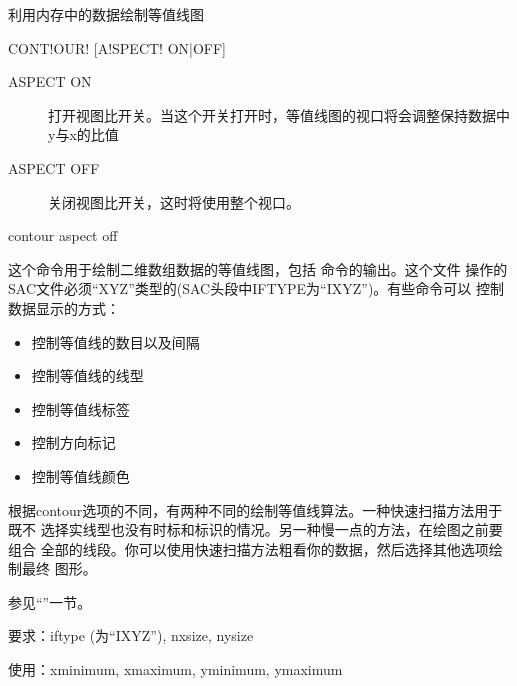 \label{cmd:contour}

利用内存中的数据绘制等值线图

\begin{SACSTX}
CONT!OUR! [A!SPECT! ON|OFF]
\end{SACSTX}

\begin{description}
\item [ASPECT ON] 打开视图比开关。当这个开关打开时，等值线图的视口将会调整保持数据中y与x的比值
\item [ASPECT OFF] 关闭视图比开关，这时将使用整个视口。
\end{description}

\begin{SACDFT}
contour  aspect  off
\end{SACDFT}

这个命令用于绘制二维数组数据的等值线图，包括 
命令的输出。这个文件
操作的SAC文件必须``XYZ''类型的(SAC头段中IFTYPE为``IXYZ'')。有些命令可以
控制数据显示的方式：
\begin{itemize}
\item {} 控制等值线的数目以及间隔
\item {} 控制等值线的线型
\item {} 控制等值线标签
\item {} 控制方向标记
\item {} 控制等值线颜色
\end{itemize}

根据contour选项的不同，有两种不同的绘制等值线算法。一种快速扫描方法用于既不
选择实线型也没有时标和标识的情况。另一种慢一点的方法，在绘图之前要组合
全部的线段。你可以使用快速扫描方法粗看你的数据，然后选择其他选项绘制最终
图形。

参见``''一节。

要求：iftype (为``IXYZ''), nxsize, nysize

使用：xminimum, xmaximum, yminimum, ymaximum
